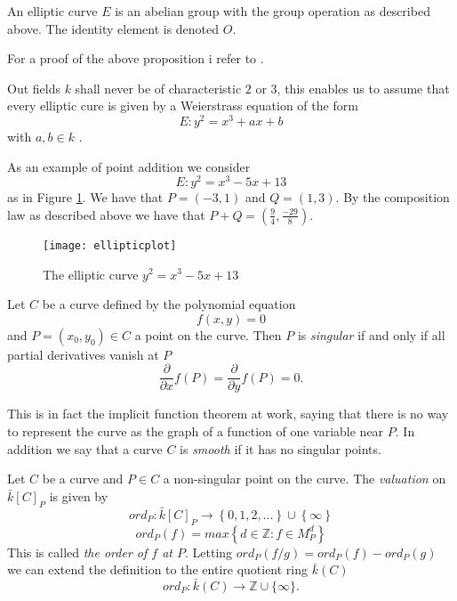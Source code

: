 \begin{prop}
  An elliptic curve $E$ is an abelian group with the group operation as described above.
The identity element is denoted $O$.
\end{prop}
For a proof of the above proposition i refer to \cite{AEC}.

Out fields $k$ shall never be of characteristic $2$ or $3$, this enables us to assume
that every elliptic cure is given by a Weierstrass equation of the form
$$ E: y^2 = x^3 + ax + b$$
with $a,b\in k$ \cite{AEC}.

\begin{ex}
 As an example of point addition we consider
$$E: y^2 = x^3-5x+13$$
as in Figure \ref{fig1}. We have that $P=(-3,1)$ and $Q=(1,3)$. By the composition law
as described above we have that $P+Q=(\frac{9}{4}, \frac{-29}{8})$.
\end{ex}



\begin{figure}\label{fig1}
  \centering
  \texttt{[image: ellipticplot]}
 \caption{The elliptic curve $y^2=x^3-5x+13$}
\end{figure}

\begin{mydef}
 Let $C$ be a curve defined by the polynomial equation
$$f(x,y) = 0$$
and $P=(x_0,y_0) \in C$ a point on the curve. Then $P$ is \emph{singular} if and only if all
partial derivatives vanish at $P$
$$\frac{\partial}{\partial x}f(P) = \frac{\partial}{\partial y}f(P) = 0.$$
\end{mydef}

This is in fact the implicit function theorem at work, saying that there is no way to
represent the curve as the graph of a function of one variable near $P$.
In addition we say that a curve $C$ is \emph{smooth} if it has no singular points.

\begin{mydef}
 Let $C$ be a curve and $P\in C$ a non-singular point on the curve. The \emph{valuation} on
$\bar{k}[C]_P$ is given by
$$ ord_P : \bar{k}[C]_P \rightarrow \left\{ 0, 1, 2, \ldots \right\} \cup \left\{ \infty \right\} $$
$$ ord_P(f) = max \left\{ d\in \mathbb{Z} : f\in M_P^d \right\} $$
This is called \emph{the order of $f$ at $P$}.
Letting $ord_P(f/g) = ord_P(f) - ord_P(g)$ we can extend the definition to the entire
quotient ring $\bar{k}(C)$
$$ ord_P: \bar{k}(C) \rightarrow \mathbb{Z}\cup \{\infty \}.$$
\end{mydef}

